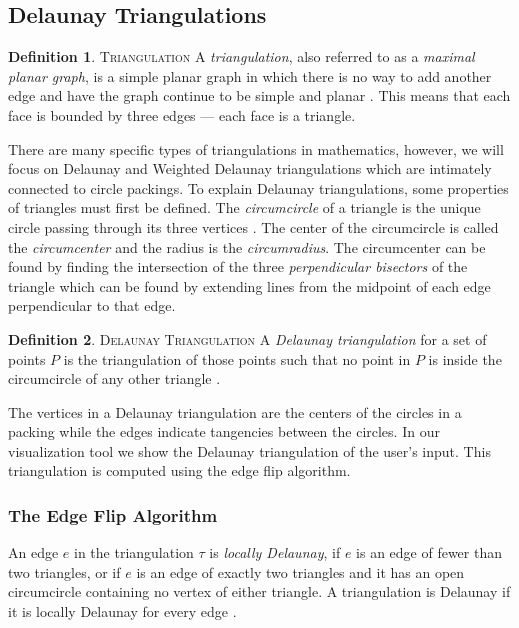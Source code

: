 \documentclass[11pt]{article}
\theoremstyle{definition}
\newtheorem{definition}{Definition}[section]
\begin{document}
\subsection{Delaunay Triangulations}
	
	\theoremstyle{definition}
	\begin{definition}{\textsc{Triangulation}}
		A \emph{triangulation}, also referred to as a \emph{maximal planar graph}, is a simple planar graph in which there is no way to add another edge and have the graph continue to be simple and planar \cite{meshGeneration}. 
		This means that each face is bounded by three edges --- each face is a triangle.
	\end{definition}

	There are many specific types of triangulations in mathematics, however, we will focus on Delaunay and Weighted Delaunay triangulations which are intimately connected to circle packings.
	To explain Delaunay triangulations, some properties of triangles must first be defined. 
	The \emph{circumcircle} of a triangle is the unique circle passing through its three vertices \cite{mathworld:Circumcenter}. 
	The center of the circumcircle is called the \emph{circumcenter} and the radius is the \emph{circumradius}. 
	The circumcenter can be found by finding the intersection of the three \emph{perpendicular bisectors} of the triangle which can be found by extending lines from the midpoint of each edge perpendicular to that edge.

  	\theoremstyle{definition}
  	\begin{definition}{\textsc{Delaunay Triangulation}}
		A \emph{Delaunay triangulation} for a set of points $P$ is the triangulation of those points such that no point in $P$ is inside the circumcircle of any other triangle \cite{meshGeneration}.
	\end{definition}
	
	The vertices in a Delaunay triangulation are the centers of the circles in a packing while the edges indicate tangencies between the circles.
	 In our visualization tool we show the Delaunay triangulation of the user's input. 
	 This triangulation is computed using the edge flip algorithm.	
	 
\subsubsection{The Edge Flip Algorithm}
	An edge $e$ in the triangulation $\tau$ is \emph{locally Delaunay}, if $e$ is an edge of fewer than two triangles, or if $e$ is an edge of exactly two triangles and it has an open circumcircle containing no vertex of either triangle. 
	A triangulation is Delaunay if it is locally Delaunay for every edge \cite{meshGeneration}.
\end{document}

